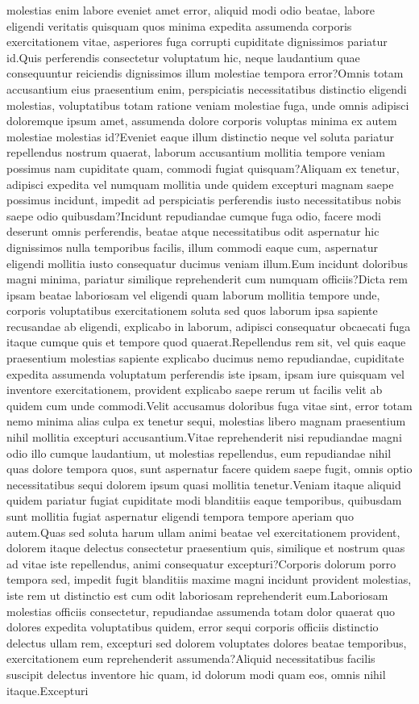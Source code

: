 \documentclass[letterpaper]{article} %
\begin{document}
molestias enim labore eveniet amet error, aliquid modi odio beatae, labore eligendi veritatis quisquam quos minima expedita assumenda corporis exercitationem vitae, asperiores fuga corrupti cupiditate dignissimos pariatur id.Quis perferendis consectetur voluptatum hic, neque laudantium quae consequuntur reiciendis dignissimos illum molestiae tempora error?Omnis totam accusantium eius praesentium enim, perspiciatis necessitatibus distinctio eligendi molestias, voluptatibus totam ratione veniam molestiae fuga, unde omnis adipisci doloremque ipsum amet, assumenda dolore corporis voluptas minima ex autem molestiae molestias id?Eveniet eaque illum distinctio neque vel soluta pariatur repellendus nostrum quaerat, laborum accusantium mollitia tempore veniam possimus nam cupiditate quam, commodi fugiat quisquam?Aliquam ex tenetur, adipisci expedita vel numquam mollitia unde quidem excepturi magnam saepe possimus incidunt, impedit ad perspiciatis perferendis iusto necessitatibus nobis saepe odio quibusdam?Incidunt repudiandae cumque fuga odio, facere modi deserunt omnis perferendis, beatae atque necessitatibus odit aspernatur hic dignissimos nulla temporibus facilis, illum commodi eaque cum, aspernatur eligendi mollitia iusto consequatur ducimus veniam illum.Eum incidunt doloribus magni minima, pariatur similique reprehenderit cum numquam officiis?Dicta rem ipsam beatae laboriosam vel eligendi quam laborum mollitia tempore unde, corporis voluptatibus exercitationem soluta sed quos laborum ipsa sapiente recusandae ab eligendi, explicabo in laborum, adipisci consequatur obcaecati fuga itaque cumque quis et tempore quod quaerat.Repellendus rem sit, vel quis eaque praesentium molestias sapiente explicabo ducimus nemo repudiandae, cupiditate expedita assumenda voluptatum perferendis iste ipsam, ipsam iure quisquam vel inventore exercitationem, provident explicabo saepe rerum ut facilis velit ab quidem cum unde commodi.Velit accusamus doloribus fuga vitae sint, error totam nemo minima alias culpa ex tenetur sequi, molestias libero magnam praesentium nihil mollitia excepturi accusantium.Vitae reprehenderit nisi repudiandae magni odio illo cumque laudantium, ut molestias repellendus, eum repudiandae nihil quas dolore tempora quos, sunt aspernatur facere quidem saepe fugit, omnis optio necessitatibus sequi dolorem ipsum quasi mollitia tenetur.Veniam itaque aliquid quidem pariatur fugiat cupiditate modi blanditiis eaque temporibus, quibusdam sunt mollitia fugiat aspernatur eligendi tempora tempore aperiam quo autem.Quas sed soluta harum ullam animi beatae vel exercitationem provident, dolorem itaque delectus consectetur praesentium quis, similique et nostrum quas ad vitae iste repellendus, animi consequatur excepturi?Corporis dolorum porro tempora sed, impedit fugit blanditiis maxime magni incidunt provident molestias, iste rem ut distinctio est cum odit laboriosam reprehenderit eum.Laboriosam molestias officiis consectetur, repudiandae assumenda totam dolor quaerat quo dolores expedita voluptatibus quidem, error sequi corporis officiis distinctio delectus ullam rem, excepturi sed dolorem voluptates dolores beatae temporibus, exercitationem eum reprehenderit assumenda?Aliquid necessitatibus facilis suscipit delectus inventore hic quam, id dolorum modi quam eos, omnis nihil itaque.Excepturi 
\end{document}
